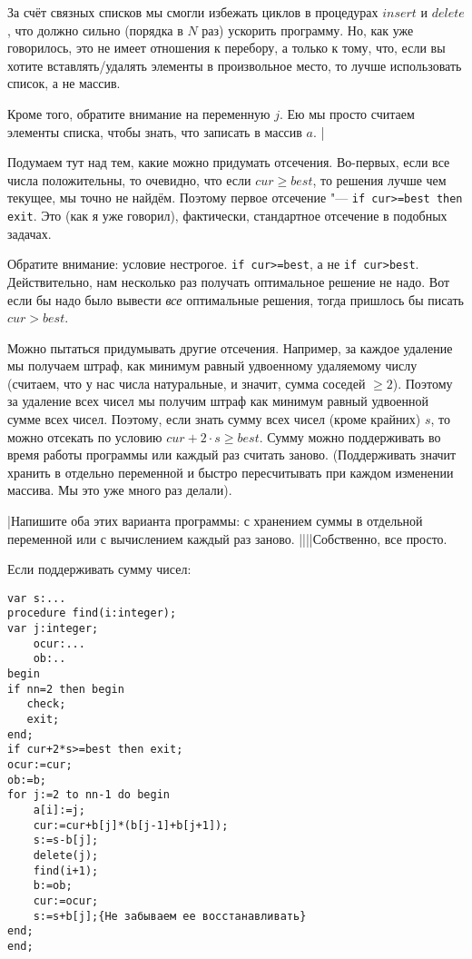 За счёт связных списков мы смогли избежать циклов в процедурах $insert$ и $delete$, что должно сильно (порядка в $N$ раз) ускорить программу. Но, как уже говорилось, это не имеет отношения к 
перебору, а только к тому, что, если вы хотите вставлять/удалять элементы в произвольное место, то лучше 
использовать список, а не массив.

Кроме того, обратите внимание на переменную $j$. Ею мы просто считаем элементы списка, чтобы знать, что записать в массив $a$.
|


Подумаем тут над тем, какие можно придумать отсечения. Во-первых, если все числа положительны, 
то очевидно, что если $cur\geq best$, то решения лучше чем текущее, мы точно не найдём. Поэтому первое отсечение "--- \texttt{if cur>=best then exit}. Это (как я уже говорил), фактически, стандартное отсечение в подобных задачах.

Обратите внимание: условие нестрогое. \texttt{if cur>=best}, а не \texttt{if cur>best}. Действительно, нам 
несколько раз получать оптимальное решение не надо. Вот если бы надо было вывести \textit{все} оптимальные решения, тогда пришлось бы писать $cur>best$.

Можно пытаться придумывать другие отсечения. Например, за каждое удаление мы получаем штраф, 
как минимум равный удвоенному удаляемому числу (считаем, что у нас числа натуральные, и значит, сумма 
соседей $\geq 2$). Поэтому за удаление всех чисел мы получим штраф как минимум равный удвоенной 
сумме всех чисел. Поэтому, если знать сумму всех чисел (кроме крайних) $s$, то можно отсекать по 
условию $cur+2\cdot s\geq best$. Сумму можно поддерживать во время работы программы или каждый раз 
считать заново. (Поддерживать значит хранить в отдельно переменной и быстро пересчитывать при каждом 
изменении массива. Мы это уже много раз делали).


\task|Напишите оба этих варианта программы: с хранением суммы в отдельной переменной или с вычислением каждый раз заново.
||||Собственно, все просто.

Если поддерживать сумму чисел:

\begin{codesample}\begin{verbatim}
var s:...
procedure find(i:integer);
var j:integer;
    ocur:...
    ob:..
begin
if nn=2 then begin
   check;
   exit;
end;
if cur+2*s>=best then exit;
ocur:=cur;
ob:=b;
for j:=2 to nn-1 do begin
    a[i]:=j;
    cur:=cur+b[j]*(b[j-1]+b[j+1]);
    s:=s-b[j];
    delete(j);
    find(i+1);
    b:=ob;
    cur:=ocur;
    s:=s+b[j];{Не забываем ее восстанавливать}
end;
end;
\end{verbatim}
\end{codesample}

